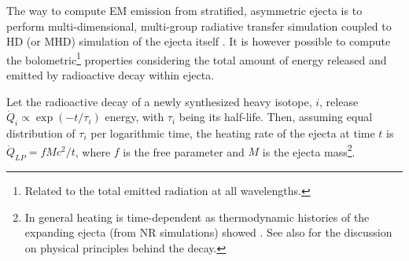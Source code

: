 
The way to compute \ac{EM} emission from stratified, asymmetric ejecta is to perform 
multi-dimensional, multi-group radiative transfer simulation coupled to \ac{HD} (or \ac{MHD}) 
simulation of the ejecta itself \citep[\eg][]{Bulla:2019muo}.
%
It is however possible to compute the bolometric\footnote{
    Related to the total emitted radiation at all wavelengths. 
} properties considering the total amount 
of energy released and emitted by radioactive decay within ejecta. 

%
%



Let the radioactive decay of a newly synthesized heavy isotope, $i$, release 
$\dot{Q}_i \propto \exp(-t/\tau_i)$ energy, with $\tau_i$ being its half-life.
Then, assuming equal distribution of $\tau_i$ per logarithmic time, 
the heating rate of the ejecta at time $t$ is 
$\dot{Q}_{LP} = f M c^2 / t$,
where $f$ is the free parameter and $M$ is the ejecta mass\footnote{
    In general heating is time-dependent as thermodynamic histories of the expanding 
    ejecta (from \ac{NR} simulations) showed \citep{Metzger:2010,Roberts:2011,Korobkin:2012uy}.
    See also \citet{Hotokezaka:2017dbk} for the discussion on physical principles behind the decay.
}.
%

